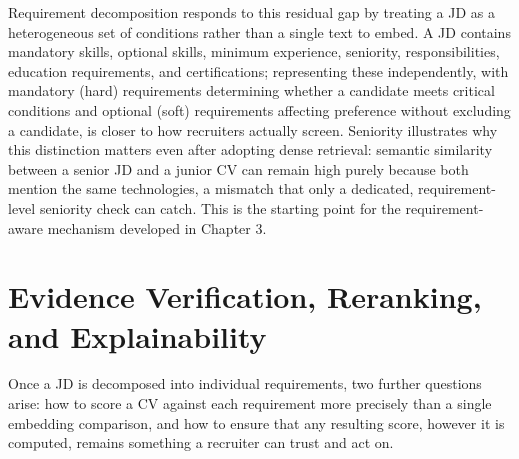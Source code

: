\documentclass[12pt,a4paper,oneside]{report}
\begin{document}
Requirement decomposition responds to this residual gap by treating a JD as a heterogeneous set of conditions rather than a single text to embed. A JD contains mandatory skills, optional skills, minimum experience, seniority, responsibilities, education requirements, and certifications; representing these independently, with mandatory (hard) requirements determining whether a candidate meets critical conditions and optional (soft) requirements affecting preference without excluding a candidate, is closer to how recruiters actually screen. Seniority illustrates why this distinction matters even after adopting dense retrieval: semantic similarity between a senior JD and a junior CV can remain high purely because both mention the same technologies, a mismatch that only a dedicated, requirement-level seniority check can catch. This is the starting point for the requirement-aware mechanism developed in Chapter 3.

\section{Evidence Verification, Reranking, and Explainability}
\label{sec:evidence-aware}
Once a JD is decomposed into individual requirements, two further questions arise: how to score a CV against each requirement more precisely than a single embedding comparison, and how to ensure that any resulting score, however it is computed, remains something a recruiter can trust and act on.
\end{document}
